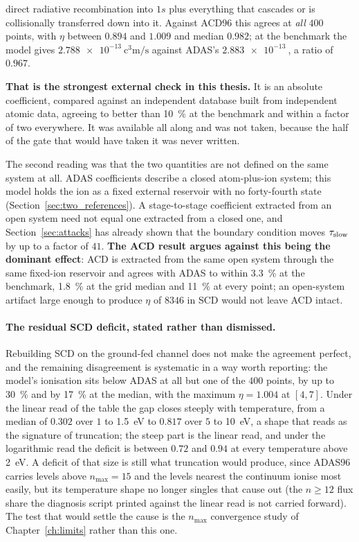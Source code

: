 \noindent direct radiative recombination into $1s$ plus everything that cascades
or is collisionally transferred down into it. Against ACD96 this agrees at
\emph{all} $400$ points, with $\eta$ between $0.894$ and $1.009$ and median
$0.982$; at the benchmark the model gives
$\SI{2.788e-13}{\cubic\centi\metre\per\second}$ against ADAS's
$\SI{2.883e-13}{}$, a ratio of $0.967$.

\textbf{That is the strongest external check in this thesis.} It is an absolute
coefficient, compared against an independent database built from independent
atomic data, agreeing to better than \SI{10}{\percent} at the benchmark and
within a factor of two everywhere. It was available all along and was not taken,
because the half of the gate that would have taken it was never written.

The second reading was that the two quantities are not defined on the same
system at all. ADAS coefficients describe a closed atom-plus-ion system; this
model holds the ion as a fixed external reservoir with no forty-fourth state
(Section~\ref{sec:two_references}). A stage-to-stage coefficient extracted from
an open system need not equal one extracted from a closed one, and
Section~\ref{sec:attacks} has already shown that the boundary condition moves
$\tau_{\mathrm{slow}}$ by up to a factor of $41$. \textbf{The ACD result argues against this
being the dominant effect}: ACD is extracted from the same open system through
the same fixed-ion reservoir and agrees with ADAS to within \SI{3.3}{\percent}
at the benchmark, \SI{1.8}{\percent} at the grid median and \SI{11}{\percent}
at every point; an open-system artifact large enough to produce $\eta$ of
$8346$ in SCD would not leave ACD intact.

\paragraph{The residual SCD deficit, stated rather than dismissed.} Rebuilding
SCD on the ground-fed channel does not make the agreement perfect, and the
remaining disagreement is systematic in a way worth reporting: the model's
ionisation sits below ADAS at all but one of the $400$ points, by up to
\SI{30}{\percent} and by \SI{17}{\percent} at the median, with the maximum
$\eta = 1.004$ at $[4,7]$. Under the linear read of the table the gap closes
steeply with temperature, from a median of $0.302$ over $1$ to
\SI{1.5}{\electronvolt} to $0.817$ over $5$ to \SI{10}{\electronvolt}, a shape
that reads as the signature of truncation; the steep part is the linear read,
and under the logarithmic read the deficit is between $0.72$ and $0.94$ at every
temperature above \SI{2}{\electronvolt}. A deficit of that size is still what
truncation would produce, since ADAS96 carries levels above $n_{\max} = 15$
and the levels nearest the continuum ionise most easily, but its temperature
shape no longer singles that cause out (the $n \ge 12$ flux share the diagnosis
script printed against the linear read is not carried forward). The test that
would settle the
cause is the $n_{\max}$ convergence study of Chapter~\ref{ch:limits} rather
than this one.

